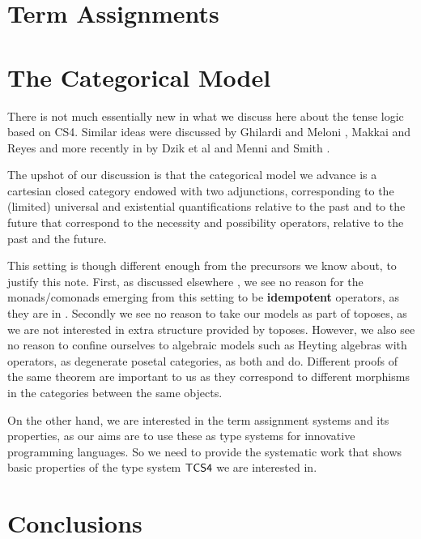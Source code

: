 \documentclass{article}
\begin{document}
\section{Term Assignments}
\label{sec:term_assignments}




\section{The Categorical Model}
There is not much essentially new in what we discuss here about the tense logic based on CS4. Similar ideas were discussed by  Ghilardi and Meloni \cite{ghilardi1988}, Makkai and Reyes \cite{makkai1995} and more recently in by Dzik et al \cite{dziketal2012} and Menni and Smith \cite{Menni:2014}.

The upshot of our discussion is that the categorical model we advance is a cartesian closed category endowed with two adjunctions, corresponding to the (limited) universal and existential quantifications relative to the past and to the future that correspond to the necessity and possibility operators, relative to the past and the future.

This setting is though  different enough from the precursors we know about, to justify this note. First, as discussed elsewhere \cite{bierman2000}, we see no reason for the monads/comonads emerging from this setting to be \textbf{idempotent} operators, as they are in \cite{ghilardi1988}. Secondly we see no reason to take our models as part of toposes, as we are not  interested in extra structure provided by toposes. 
However, we also see no reason to confine ourselves to algebraic models such as Heyting algebras with operators, as degenerate posetal categories, as both \cite{dziketal2012} and  \cite{Menni:2014} do. Different proofs of the same theorem are important to us as they correspond to different morphisms in the categories between the same objects.

On the other hand, we are interested in the term assignment systems and its properties, as our aims are to use these as type systems for innovative programming languages. So we need to provide the systematic work that shows basic properties of the type system $\sf{TCS4}$ we are interested in.


\section{Conclusions}




\end{document}

